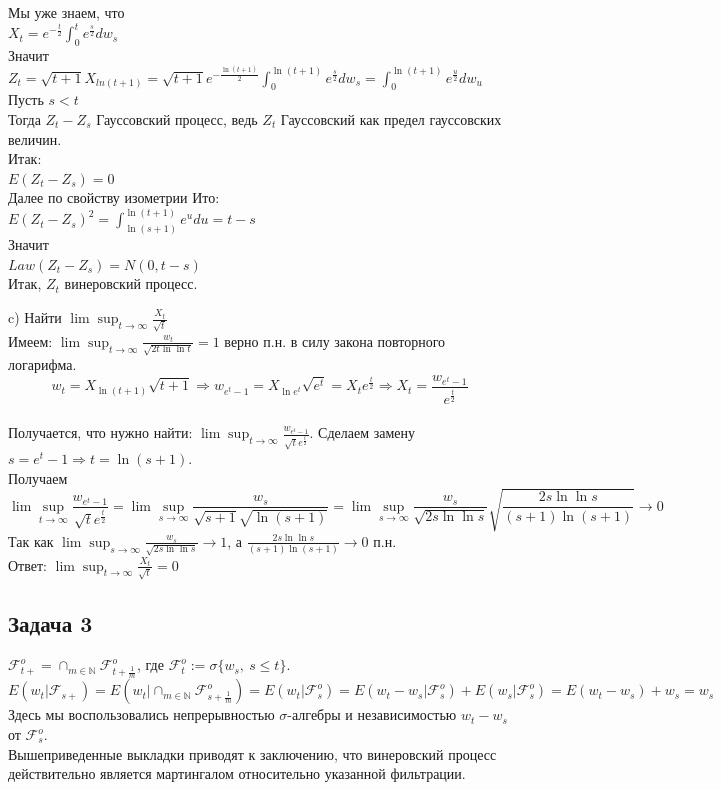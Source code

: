 \documentclass[12pt]{article}
\newcommand\cF{{\mathcal F}}
\begin{document}
Мы уже знаем, что\\
$X_t=e^{-\frac{t}{2}}\int_{0}^{t}e^{\frac{s}{2}}dw_s$\\

Значит\\
$Z_t=\sqrt{t+1}X_{ln(t+1)}=\sqrt{t+1}e^{-\frac{\ln(t+1)}{2}}\int_{0}^{\ln(t+1)}e^{\frac{s}{2}}dw_s=\int_{0}^{\ln(t+1)}e^{\frac{u}{2}}dw_u$\\

Пусть $s<t$\\
Тогда $Z_t-Z_s$ Гауссовский процесс, ведь $Z_t$ Гауссовский как предел гауссовских величин.\\

Итак:\\
$E(Z_t-Z_s)=0$\\

Далее по свойству изометрии Ито:\\

$E(Z_t-Z_s)^2=\int_{\ln(s+1)}^{\ln(t+1)}e^{u}du=t-s$\\

Значит\\

$Law(Z_t-Z_s)= N(0,t-s)$\\

Итак, $Z_t$ винеровский процесс.


c) Найти $\lim\sup_{t\to\infty} \frac{X_t}{\sqrt{t}}$\\
Имеем: $\lim\sup_{t \to \infty}\frac{w_t}{\sqrt{2t\ln\ln t}}=1$ верно п.н. в силу закона повторного логарифма. \\
$$w_t=X_{\ln{(t+1)}}\sqrt{t+1}\Rightarrow w_{e^t-1}=X_{\ln{e^t}}\sqrt{e^t}=X_te^{\frac{t}{2}}\Rightarrow X_t=\frac{w_{e^t-1}}{e^{\frac{t}{2}}}$$\\
Получается, что нужно найти:
$\lim\sup_{t\to\infty}\frac{w_{e^t-1}}{\sqrt{t}e^{\frac{t}{2}}}$.
Сделаем замену $s=e^t-1\Rightarrow t=\ln(s+1).$\\
Получаем
$$\lim\sup_{t\to\infty}\frac{w_{e^t-1}}{\sqrt{t}e^{\frac{t}{2}}}=\lim\sup_{s\to\infty}\frac{w_s}{\sqrt{s+1}\sqrt{\ln(s+1)}}=\lim\sup_{s\to\infty}\frac{w_s}{\sqrt{2s\ln\ln s}}\sqrt{\frac{2s\ln\ln s}{(s+1)\ln(s+1)}}\to 0$$
Так как $\lim\sup_{s\to\infty}\frac{w_s}{\sqrt{2s\ln\ln s}} \to 1$, а $\frac{2s\ln\ln s}{(s+1)\ln(s+1)} \to 0$ п.н.\\
Ответ: $\lim\sup_{t\to\infty}\frac{X_t}{\sqrt{t}}= 0$

\subsection{Задача 3}
$\cF^o_{t+} = \cap_{m \in \mathbb{N}}\cF^o_{t+\frac{1}{m}}$, где $\cF^o_t:=\sigma\{w_s,\ s\le t\}$.
\[E(w_t | \cF_{s+}) = E(w_t | \cap_{m \in \mathbb{N}}\cF^o_{s+\frac{1}{m}}) = E(w_t | \cF_s^o) = E(w_t-w_s | \cF_s^o) + E(w_s | \cF_s^o) = E(w_t-w_s) + w_s = w_s\]
Здесь мы воспользовались непрерывностью $\sigma$-алгебры и независимостью $w_t-w_s$ от $\cF_s^o$.\\
Вышеприведенные выкладки приводят к заключению, что винеровский процесс действительно является мартингалом относительно указанной фильтрации.
\end{document}
